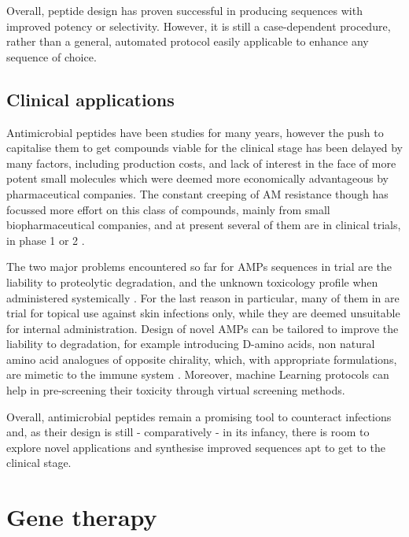 
Overall, peptide design has proven successful in producing sequences with improved potency or selectivity. However, it is still a case-dependent procedure, rather than a general, automated protocol easily applicable to enhance any sequence of choice.


\subsection{Clinical applications}
Antimicrobial peptides have been studies for many years, however the push to capitalise them to get compounds viable for the clinical stage has been delayed by many factors, including production costs, and lack of interest in the face of more potent small molecules which were deemed more economically advantageous by pharmaceutical companies.
%
The constant creeping of AM resistance though has focussed more effort on this class of compounds, mainly from small biopharmaceutical companies, and at present several of them are in clinical trials, in phase 1 or 2 \cite{Naafs2018}.

The two major problems encountered so far for AMPs sequences in trial are the liability to proteolytic degradation, and the unknown toxicology profile when administered systemically \cite{Hancock2006}. For the last reason in particular, many of them in are trial for topical use against skin infections only, while they are deemed unsuitable for internal administration.
%
Design of novel AMPs can be tailored to improve the liability to degradation, for example introducing D-amino acids, non natural amino acid analogues of opposite chirality, which, with appropriate formulations, are mimetic to the immune system \cite{Wipf2009,Choudhary2011}. Moreover, machine Learning protocols can help in pre-screening their toxicity through virtual screening methods.

Overall, antimicrobial peptides remain a promising tool to counteract infections and, as their design is still - comparatively - in its infancy, there is room to explore novel applications and synthesise improved sequences apt to get to the clinical stage.


\section{Gene therapy} \label{sec:gene_th}

